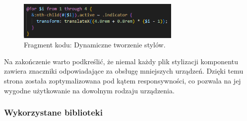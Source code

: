 \documentclass[12pt,a4paper]{article}
\begin{document}
\vspace{0.5cm}
\begin{figure}[h!]
    \centering
    \includegraphics[width=0.7\textwidth]{images/ex_loop_scss.png}
    \caption{Fragment kodu: Dynamiczne tworzenie stylów.}
\end{figure}
\vspace{0.5cm}

Na zakończenie warto podkreślić, że niemal każdy plik stylizacji komponentu zawiera znaczniki odpowiadające za obsługę mniejszych urządzeń. Dzięki temu strona została zoptymalizowana pod kątem responsywności, co pozwala na jej wygodne użytkowanie na dowolnym rodzaju urządzenia.


\newpage

\subsubsection{Wykorzystane biblioteki}
\end{document}
